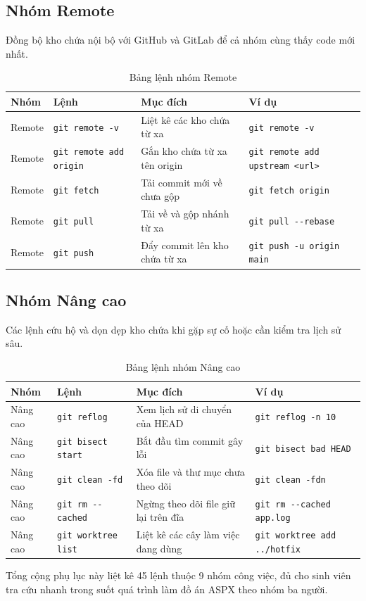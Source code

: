 \subsection{Nhóm Remote}
Đồng bộ kho chứa nội bộ với GitHub và GitLab để cả nhóm cùng thấy code mới nhất.
\begin{table}[H]
\centering
\small
\begin{tabular}{p{1.7cm} p{3.2cm} p{4.5cm} p{4.6cm}}
\toprule
Nhóm & Lệnh & Mục đích & Ví dụ \\
\midrule
Remote & \verb|git remote -v| & Liệt kê các kho chứa từ xa & \verb|git remote -v| \\
Remote & \verb|git remote add origin| & Gắn kho chứa từ xa tên origin & \verb|git remote add upstream <url>| \\
Remote & \verb|git fetch| & Tải commit mới về chưa gộp & \verb|git fetch origin| \\
Remote & \verb|git pull| & Tải về và gộp nhánh từ xa & \verb|git pull --rebase| \\
Remote & \verb|git push| & Đẩy commit lên kho chứa từ xa & \verb|git push -u origin main| \\
\bottomrule
\end{tabular}
\caption{Bảng lệnh nhóm Remote}
\label{tab:pa-remote}
\end{table}

\subsection{Nhóm Nâng cao}
Các lệnh cứu hộ và dọn dẹp kho chứa khi gặp sự cố hoặc cần kiểm tra lịch sử sâu.
\begin{table}[H]
\centering
\small
\begin{tabular}{p{1.7cm} p{3.2cm} p{4.5cm} p{4.6cm}}
\toprule
Nhóm & Lệnh & Mục đích & Ví dụ \\
\midrule
Nâng cao & \verb|git reflog| & Xem lịch sử di chuyển của HEAD & \verb|git reflog -n 10| \\
Nâng cao & \verb|git bisect start| & Bắt đầu tìm commit gây lỗi & \verb|git bisect bad HEAD| \\
Nâng cao & \verb|git clean -fd| & Xóa file và thư mục chưa theo dõi & \verb|git clean -fdn| \\
Nâng cao & \verb|git rm --cached| & Ngừng theo dõi file giữ lại trên đĩa & \verb|git rm --cached app.log| \\
Nâng cao & \verb|git worktree list| & Liệt kê các cây làm việc đang dùng & \verb|git worktree add ../hotfix| \\
\bottomrule
\end{tabular}
\caption{Bảng lệnh nhóm Nâng cao}
\label{tab:pa-nangcao}
\end{table}

Tổng cộng phụ lục này liệt kê 45 lệnh thuộc 9 nhóm công việc, đủ cho sinh viên
tra cứu nhanh trong suốt quá trình làm đồ án ASPX theo nhóm ba người.
